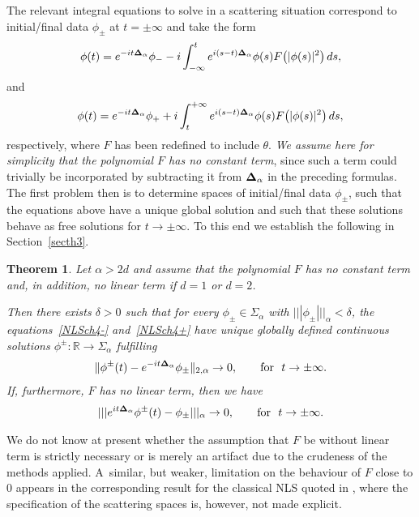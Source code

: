 \documentclass[10pt,a4paper]{amsart}
\newtheorem{theorem}{Theorem}
\begin{document}
The relevant integral equations to solve in a scattering situation
correspond to initial/f\/inal data $\phi_\pm$ at $t=\pm\infty$ and
take the form
\begin{gather}
\label{NLSch4-}
\phi(t)=e^{-it{{\bf\Delta}_\alpha}}\phi_--i\int_{-\infty}^t
e^{i{(s-t){\bf\Delta}_\alpha}}\phi(s) F\big(|\phi(s)|^2\big)\,ds ,
\end{gather}
and
\begin{gather}
\label{NLSch4+}
\phi(t)=e^{-it{{\bf\Delta}_\alpha}}\phi_++i\int^{+\infty}_t
e^{i{(s-t){\bf\Delta}_\alpha}}\phi(s) F\big(|\phi(s)|^2\big)\,ds ,
\end{gather}
respectively, where $F$ has been redef\/ined to include $\theta$.
 {\it We assume here for simplicity that the polynomial $F$
has no constant term}, since such a term could trivially be incorporated by
subtracting it from ${\bf\Delta}_\alpha$ in the preceding formulas.   The
f\/irst problem
then is to determine spaces of initial/f\/inal data $\phi_\pm$, such that the
equations above have a unique global solution and such that these
solutions behave as free solutions for $t\to \pm\infty$.
To this end we establish the following in Section~\ref{secth3}.

\begin{theorem}\label{th3}
Let $\alpha>2d$ and assume that the polynomial $F$ has no constant
term and, in addition, no linear term
if $d=1$ or $d=2$.

Then there exists $\delta>0$ such that for every
 $\phi_\pm\in\Sigma_{\alpha}$ with $|||\phi_\pm|||_{\alpha}<\delta$, the
equations~\eqref{NLSch4-} and~\eqref{NLSch4+} have unique globally
defined continuous solutions $\phi^\pm:\mathbb R\to \Sigma_{\alpha}$ fulfilling
\begin{gather}\label{solsmall1}
\Vert\phi^\pm(t)- e^{-it{{\bf\Delta}_\alpha}}\phi_\pm\Vert_{2,\alpha}  \to
0,\qquad\mbox{for}\ \ t\to\pm\infty .
\end{gather}
If, furthermore, $F$ has no linear term, then we have
\begin{gather}\label{solsmall2}
 |||e^{it{{\bf\Delta}_\alpha}}\phi^\pm(t)- \phi_\pm |||_{\alpha}  \to
0,\qquad\mbox{for}\  \ t\to\pm\infty .
\end{gather}
\end{theorem}


\begin{remark} We do not know at present whether the assumption that $F$
be without linear term is strictly necessary or is merely an artifact
due to the crudeness of the methods applied. A~similar, but weaker,
limitation on the behaviour of $F$ close to $0$
appears in the corresponding result for the classical NLS quoted in
\cite[Teorem 6.6]{Strauss}, where the specif\/ication of the scattering
spaces is, however, not made explicit.
\end{remark}
\end{document}
